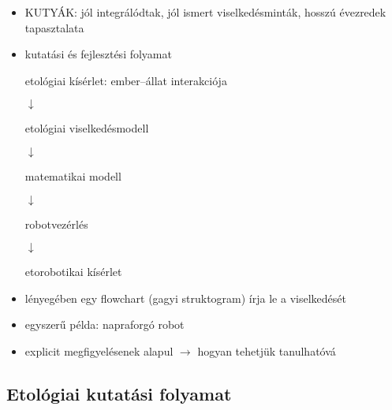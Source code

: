 \documentclass[a4paper, 11pt]{article}
\begin{document}
\begin{itemize}
	\item KUTYÁK: jól integrálódtak, jól ismert viselkedésminták, hosszú évezredek tapasztalata
	\item kutatási és fejlesztési folyamat
	\begin{center}
		etológiai kísérlet: ember--állat interakciója
		
		$\downarrow$
		
		etológiai viselkedésmodell
		
		$\downarrow$
		
		matematikai modell
		
		$\downarrow$
		
		robotvezérlés
		
		$\downarrow$
		
		etorobotikai kísérlet
	\end{center}
	\item lényegében egy flowchart (gagyi struktogram) írja le a viselkedését
	\item egyszerű példa: napraforgó robot
	\item explicit megfigyelésenek alapul $\to$ hogyan tehetjük tanulhatóvá
\end{itemize}

\subsection{Etológiai kutatási folyamat}
\end{document}
